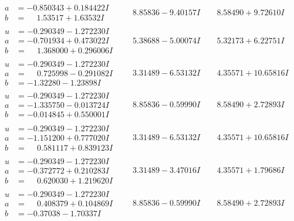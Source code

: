 \documentclass[1p]{elsarticle_modified}
\theoremstyle{definition}
\begin{document}
$$\begin{array}{c|c|c}
\begin{aligned}
a &= -0.850343 + 0.184422 I \\
b &= \phantom{-}1.53517 + 1.63532 I\end{aligned}
 & \phantom{-}8.85836 - 9.40157 I & \phantom{-}8.58490 + 9.72610 I \\ \hline\begin{aligned}
u &= -0.290349 - 1.272230 I \\
a &= -0.701934 + 0.473022 I \\
b &= \phantom{-}1.368000 + 0.296006 I\end{aligned}
 & \phantom{-}5.38688 - 5.00074 I & \phantom{-}5.32173 + 6.22751 I \\ \hline\begin{aligned}
u &= -0.290349 - 1.272230 I \\
a &= \phantom{-}0.725998 - 0.291082 I \\
b &= -1.32280 - 1.23898 I\end{aligned}
 & \phantom{-}3.31489 - 6.53132 I & \phantom{-}4.35571 + 10.65816 I \\ \hline\begin{aligned}
u &= -0.290349 - 1.272230 I \\
a &= -1.335750 - 0.013724 I \\
b &= -0.014845 + 0.550001 I\end{aligned}
 & \phantom{-}8.85836 - 0.59990 I & \phantom{-}8.58490 + 2.72893 I \\ \hline\begin{aligned}
u &= -0.290349 - 1.272230 I \\
a &= -1.151200 + 0.777020 I \\
b &= \phantom{-}0.581117 + 0.839123 I\end{aligned}
 & \phantom{-}3.31489 - 6.53132 I & \phantom{-}4.35571 + 10.65816 I \\ \hline\begin{aligned}
u &= -0.290349 - 1.272230 I \\
a &= -0.372772 + 0.210283 I \\
b &= \phantom{-}0.620030 + 1.219620 I\end{aligned}
 & \phantom{-}3.31489 - 3.47016 I & \phantom{-}4.35571 + 1.79686 I \\ \hline\begin{aligned}
u &= -0.290349 - 1.272230 I \\
a &= \phantom{-}0.408379 + 0.104869 I \\
b &= -0.37038 - 1.70337 I\end{aligned}
 & \phantom{-}8.85836 - 0.59990 I & \phantom{-}8.58490 + 2.72893 I \\ \hline\begin{aligned}

\end{aligned}
\end{array}$$
\end{document}
